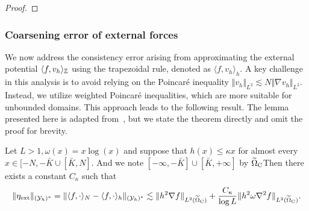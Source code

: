 \begin{proof}
\end{proof}

\subsubsection{Coarsening error of external forces}
\label{sec: external_forces_qnll_cg}
We now address the consistency error arising from approximating the external potential $\langle f, v_{h} \rangle_{\mathbb{Z}}$ using the trapezoidal rule, denoted as $\langle f, v_{h} \rangle_{h}$. A key challenge in this analysis is to avoid relying on the Poincaré inequality $\Vert v_{h} \Vert_{L^{2}} \lesssim N\Vert \nabla v_{h} \Vert_{L^{2}}$. Instead, we utilize weighted Poincaré inequalities, which are more suitable for unbounded domains. This approach leads to the following result. The lemma presented here is adapted from~\cite[Theorem 6.13]{2013_ML_CO_AC_Coupling_ACTANUM}, but we state the theorem directly and omit the proof for brevity.

\begin{lemma}
	Let $L>1,\omega(x) = x\log(x)$ and suppose that $h(x)\le \kappa x$ for almost every $x\in [-N,-\bar{K}\cup[\bar{K},N]$. And we note $[-\infty,-\bar{K}]\cup[\bar{K},+\infty]$ by $\widetilde{\Omega}_{{\rm C}}$Then there exists a constant $C_{\kappa}$ such that
	\begin{equation*}
		\Vert \eta_{\text{ext}}\Vert_{(\mathcal{Y}_{h})^{*}} = \Vert \langle f,\cdot\rangle_{N} - \langle f,\cdot\rangle_{h}\Vert_{(\mathcal{Y}_{h})^{*}} \lesssim \Vert h^{2} \nabla f\Vert_{L^{2}(\widetilde{\Omega}_{{\rm C}})} +\frac{C_{\kappa}}{\log L} \Vert h^{2}\omega \nabla^{2}f\Vert_{L^{2}(\widetilde{\Omega}_{{\rm C}})}.
	\end{equation*}
\end{lemma}

